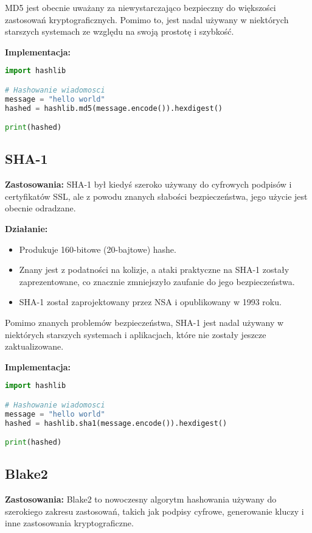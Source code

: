 \documentclass{article}
\begin{document}
MD5 jest obecnie uważany za niewystarczająco bezpieczny do większości zastosowań kryptograficznych. Pomimo to, jest nadal używany w niektórych starszych systemach ze względu na swoją prostotę i szybkość.

\textbf{Implementacja:}
\begin{lstlisting}[language=Python]
import hashlib

# Hashowanie wiadomosci
message = "hello world"
hashed = hashlib.md5(message.encode()).hexdigest()

print(hashed)
\end{lstlisting}

\subsection{SHA-1}
\textbf{Zastosowania:} SHA-1 był kiedyś szeroko używany do cyfrowych podpisów i certyfikatów SSL, ale z powodu znanych słabości bezpieczeństwa, jego użycie jest obecnie odradzane.

\textbf{Działanie:}
\begin{itemize}
    \item Produkuje 160-bitowe (20-bajtowe) hashe.
    \item Znany jest z podatności na kolizje, a ataki praktyczne na SHA-1 zostały zaprezentowane, co znacznie zmniejszyło zaufanie do jego bezpieczeństwa.
    \item SHA-1 został zaprojektowany przez NSA i opublikowany w 1993 roku.
\end{itemize}

Pomimo znanych problemów bezpieczeństwa, SHA-1 jest nadal używany w niektórych starszych systemach i aplikacjach, które nie zostały jeszcze zaktualizowane.

\textbf{Implementacja:}
\begin{lstlisting}[language=Python]
import hashlib

# Hashowanie wiadomosci
message = "hello world"
hashed = hashlib.sha1(message.encode()).hexdigest()

print(hashed)
\end{lstlisting}

\subsection{Blake2}
\textbf{Zastosowania:} Blake2 to nowoczesny algorytm hashowania używany do szerokiego zakresu zastosowań, takich jak podpisy cyfrowe, generowanie kluczy i inne zastosowania kryptograficzne.
\end{document}
